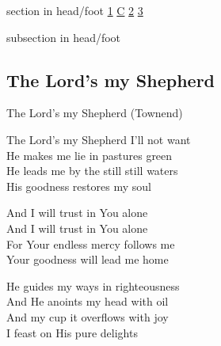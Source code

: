 \documentclass{beamer}
\begin{document}
{
{ 
 {
 \begin{beamercolorbox}[ht=4.5ex,dp=1.5ex,%
      leftskip=.3cm,rightskip=.3cm plus1fil]{section in head/foot}
 \fontsize{12}{25}\selectfont 
\hyperlink{The Lord's my Shepherd['Psalm 23'](Townend)1}{1}
\hyperlink{The Lord's my Shepherd['Psalm 23'](Townend)C}{C}
\hyperlink{The Lord's my Shepherd['Psalm 23'](Townend)2}{2}
\hyperlink{The Lord's my Shepherd['Psalm 23'](Townend)3}{3}
 
 \end{beamercolorbox}%
  \begin{beamercolorbox}[ht=2.5ex,dp=1.125ex,%
   leftskip=.3cm,rightskip=.3cm plus1fil]{subsection in head/foot}
   \insertauthor
 \end{beamercolorbox}%
 }
}
\subsection{ The Lord's my Shepherd }

\hypertarget{The Lord's my Shepherd['Psalm 23'](Townend)1}{}
\begin{frame}{The Lord's my Shepherd (Townend)}
\fontsize{ 20 }{ 27 }\selectfont

The Lord's my Shepherd I'll not want\\ 
He makes me lie in pastures green\\ 
He leads me by the still still waters\\ 
His goodness restores my soul 

\end{frame}

\hypertarget{The Lord's my Shepherd['Psalm 23'](Townend)C}{}
\begin{frame}{}
\fontsize{ 20 }{ 27 }\selectfont

And I will trust in You alone\\ 
And I will trust in You alone\\ 
For Your endless mercy follows me\\ 
Your goodness will lead me home 

\end{frame}

\hypertarget{The Lord's my Shepherd['Psalm 23'](Townend)2}{}
\begin{frame}{}
\fontsize{ 20 }{ 27 }\selectfont

He guides my ways in righteousness\\ 
And He anoints my head with oil\\ 
And my cup it overflows with joy\\ 
I feast on His pure delights 


\end{frame}}
\end{document}
